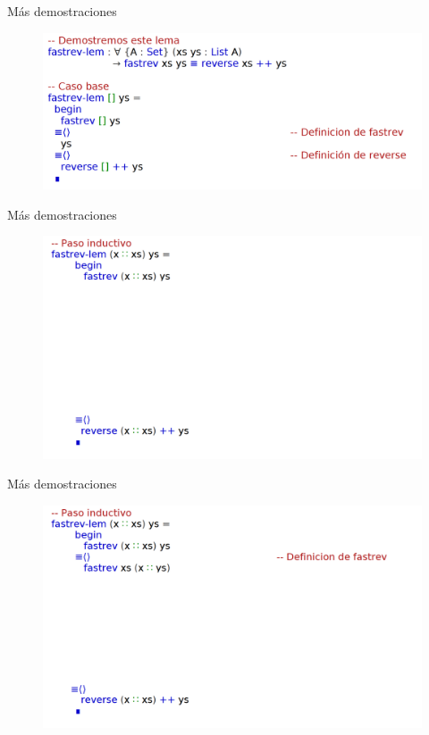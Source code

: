 \documentclass[11pt]{beamer}
\begin{document}
\begin{frame}{Más demostraciones}
\begin{figure}
\includegraphics[scale=0.55]{img/fastrev-lem01}
\end{figure}
\end{frame}


\begin{frame}{Más demostraciones}
\begin{figure}
\includegraphics[scale=0.65]{img/fastrev-lem-dem01}
\end{figure}
\end{frame}

\begin{frame}{Más demostraciones}
\begin{figure}
\includegraphics[scale=0.65]{img/fastrev-lem-dem02}
\end{figure}
\end{frame}
\end{document}
